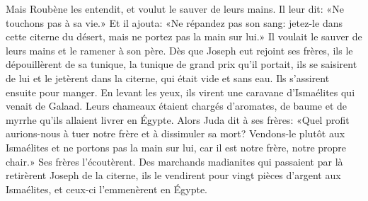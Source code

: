 Mais Roubène les entendit, et voulut le sauver de leurs mains.
	Il leur dit: «Ne touchons pas à sa vie.»
Et il ajouta: «Ne répandez pas son sang:
	jetez-le dans cette citerne du désert, mais ne portez pas la main sur lui.»
Il voulait le sauver de leurs mains et le ramener à son père.
Dès que Joseph eut rejoint ses frères,
	ils le dépouillèrent de sa tunique, la tunique de grand prix qu’il portait,
	ils se saisirent de lui et le jetèrent dans la citerne,
	qui était vide et sans eau.
Ils s’assirent ensuite pour manger.
En levant les yeux, ils virent une caravane d’Ismaélites qui venait de Galaad.
Leurs chameaux étaient chargés d’aromates, de baume et de myrrhe
	qu’ils allaient livrer en Égypte.
Alors Juda dit à ses frères:
	«Quel profit aurions-nous à tuer notre frère et à dissimuler sa mort?
	Vendons-le plutôt aux Ismaélites et ne portons pas la main sur lui,
	car il est notre frère, notre propre chair.»
Ses frères l’écoutèrent.
Des marchands madianites qui passaient par là retirèrent Joseph de la citerne,
	ils le vendirent pour vingt pièces d’argent aux Ismaélites,
	et ceux-ci l’emmenèrent en Égypte.
